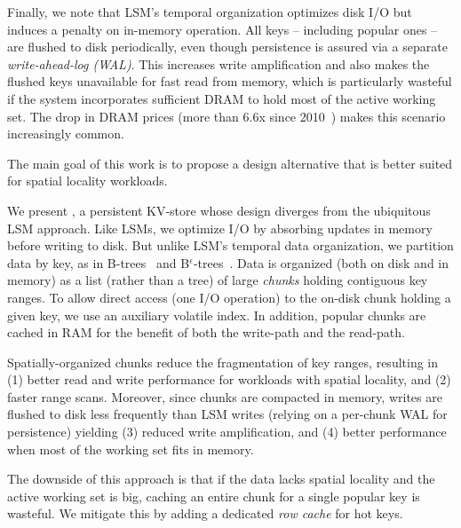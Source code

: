 Finally, we note that LSM's temporal  organization optimizes disk I/O but induces a penalty on in-memory operation. 
All keys -- including popular ones -- are flushed to disk periodically, even though persistence is assured 
via a separate \emph{write-ahead-log (WAL)}.
This increases write amplification and also makes the flushed keys unavailable for fast read from memory,
which is particularly wasteful if the system incorporates sufficient DRAM to hold most of the active working set. 
The drop in DRAM prices (more than $6.6$x since 2010~\cite{dram-prices})  
makes this scenario increasingly common.  

The main goal of this work is to propose a design alternative  that is better suited for spatial locality workloads. 

We present \sys, a persistent KV-store whose design diverges from the ubiquitous LSM approach.  
Like  LSMs,  we optimize I/O by absorbing updates in memory before writing to disk. 
But unlike LSM's temporal data organization, we partition data by key, as in B-trees~\cite{Comer79} and B$^\epsilon$-trees~\cite{Bender15}. 
Data is  organized (both on disk and in memory) as a list (rather than a tree) 
of large \emph{chunks} holding contiguous key ranges.
To allow direct access (one I/O operation) to the on-disk chunk holding a given key, we use an auxiliary volatile index.  
In addition, popular chunks are cached in RAM for the benefit of  both the write-path and the read-path.

Spatially-organized chunks reduce the fragmentation of key ranges, resulting in 
(1) better read and write performance for workloads with spatial locality,  and
(2) faster range scans. 
Moreover, since chunks  are compacted in memory, writes are 
flushed to disk less frequently than LSM writes (relying on a per-chunk WAL for persistence)
yielding 
(3) reduced write amplification, and 
(4) better performance when most of the working set fits in memory.

The downside of this approach is that if the data lacks spatial locality and the active working set is big, 
caching an entire chunk for a single popular key is wasteful. We mitigate this  by adding 
a dedicated \emph{row cache} for hot keys. 

